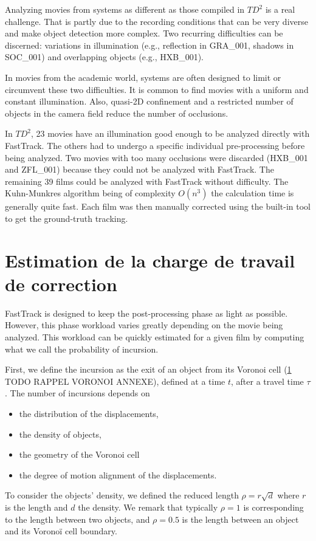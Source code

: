     Analyzing movies from systems as different as those compiled in $TD^2$ is a real challenge. That is partly due to the recording conditions that can be very diverse and make object detection more complex. Two recurring difficulties can be discerned: variations in illumination (e.g., reflection in GRA\_001, shadows in SOC\_001) and overlapping objects (e.g., HXB\_001).

    In movies from the academic world, systems are often designed to limit or circumvent these two difficulties. It is common to find movies with a uniform and constant illumination. Also, quasi-2D confinement and a restricted number of objects in the camera field reduce the number of occlusions.

    In $TD^2$, 23 movies have an illumination good enough to be analyzed directly with FastTrack. The others had to undergo a specific individual pre-processing before being analyzed. Two movies with too many occlusions were discarded (HXB\_001 and ZFL\_001) because they could not be analyzed with FastTrack.
    The remaining 39 films could be analyzed with FastTrack without difficulty. The Kuhn-Munkres algorithm being of complexity $O(n^3)$ the calculation time is generally quite fast. Each film was then manually corrected using the built-in tool to get the ground-truth tracking.

	\section{Estimation de la charge de travail de correction}
    FastTrack is designed to keep the post-processing phase as light as possible. However, this phase workload varies greatly depending on the movie being analyzed. This workload can be quickly estimated for a given film by computing what we call the probability of incursion.

    First, we define the incursion as the exit of an object from its Voronoi cell (\ref{} TODO RAPPEL VORONOI ANNEXE), defined at a time $t$, after a travel time $\tau$. The number of incursions depends on
    \begin{itemize}
    \item the distribution of the displacements,
    \item the density of objects,
    \item the geometry of the Voronoi cell
    \item the degree of motion alignment of the displacements.
    \end{itemize}
    To consider the objects' density, we defined the reduced length $\rho=r\sqrt{d}$ where $r$ is the length and $d$ the density. We remark that typically $\rho=1$ is corresponding to the length between two objects, and $\rho=0.5$ is the length between an object and its Voronoï cell boundary.


